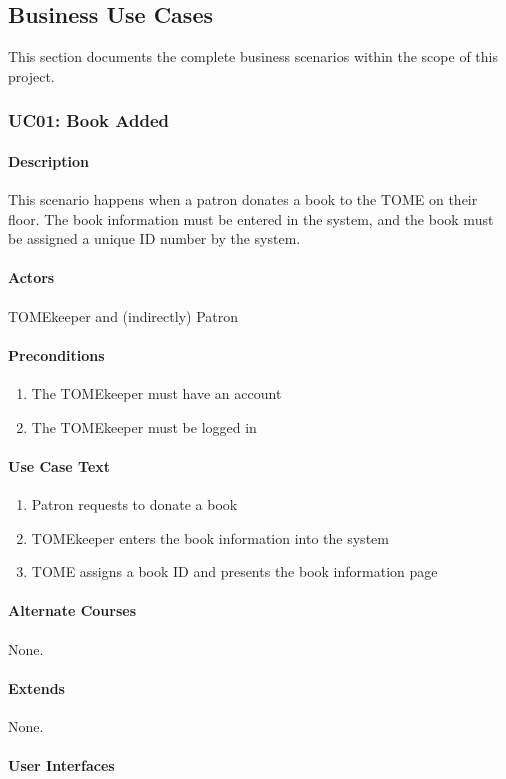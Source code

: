 \documentclass[12pt,titlepage]{article}
\begin{document}
\subsection{Business Use Cases}
This section documents the complete business scenarios within the scope of this project.


\subsubsection{UC01: Book Added}
\paragraph{Description}
This scenario happens when a patron donates a book to the TOME on their floor.  The book information must be entered in the system, and the book must be assigned a unique ID number by the system.
\paragraph{Actors}
TOMEkeeper and (indirectly) Patron
\paragraph{Preconditions}
\begin{enumerate}
	\item The TOMEkeeper must have an account
	\item The TOMEkeeper must be logged in
\end{enumerate}
\paragraph{Use Case Text}
\begin{enumerate}
	\item Patron requests to donate a book
	\item TOMEkeeper enters the book information into the system
	\item TOME assigns a book ID and presents the book information page
\end{enumerate}
\paragraph{Alternate Courses}
None.
\paragraph{Extends}
None.
\paragraph{User Interfaces}
\end{document}
